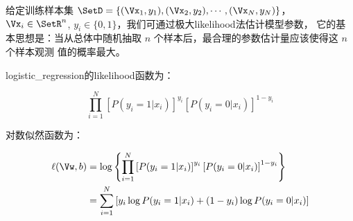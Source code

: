 给定训练样本集 $\SetD = \{(\Vx_1, y_1), (\Vx_2, y_2), \cdots, (\Vx_N, y_N)\}$，
$\Vx_i \in \SetR^n$, $y_i \in \{0, 1\}$，我们可通过极大\gls{likelihood}法估计模型参数，
它的基本思想是：当从总体中随机抽取 $n$ 个样本后，最合理的参数估计量应该使得这 $n$ 个样本观测
值的概率最大。

\gls{logistic_regression}的\gls{likelihood}函数为：

\begin{equation}
	\prod_{i = 1}^N \left[P(y_i = 1 | x_i)\right]^{y_i} \left[P(y_i = 0 | x_i)\right]^{1 - y_i} 
\end{equation}

对数似然函数为：

\begin{align}
	\ell(\Vw, b) &= \log\left\{\prod_{i = 1}^N \left[P(y_i = 1 | x_i)\right]^{y_i} \left[P(y_i = 0 | x_i)\right]^{1 - y_i} \right\} \nonumber \\
	             &= \sum\limits_{i=1}^N\left[y_i\log P(y_i = 1 | x_i)+(1-y_i)\log P(y_i = 0 | x_i)\right] \nonumber 
\end{align}
















